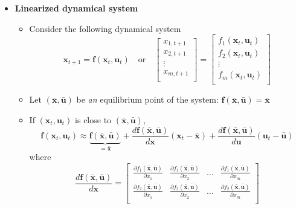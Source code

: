 \documentclass[12pt,a4paper]{article}
\begin{document}
\begin{itemize}
\item \textbf{Linearized dynamical system}
  \begin{itemize}
  \item Consider the following dynamical system
    \begin{equation}\label{eq:nlds_discrete}%
      \bm{x}_{t+1} = \bm{f}(\bm{x}_{t},\bm{u}_{t})
      \quad\text{or}\quad
      \begin{bmatrix}
        x_{1,t+1} \\
        x_{2,t+1} \\
        \vdots \\
        x_{m,t+1} \\
      \end{bmatrix}
      = 
      \begin{bmatrix}
        f_{1}(\bm{x}_{t},\bm{u}_{t}) \\
        f_{2}(\bm{x}_{t},\bm{u}_{t}) \\
        \vdots \\
        f_{m}(\bm{x}_{t},\bm{u}_{t}) \\
      \end{bmatrix}
    \end{equation}
  \item Let $(\bar{\bm{x}},\bar{\bm{u}})$ be \emph{an} equilibrium point of the system:
    $\bm{f}(\bar{\bm{x}},\bar{\bm{u}}) = \bar{\bm{x}}$
  \item If $(\bm{x}_{t},\bm{u}_{t})$ is close to $(\bar{\bm{x}},\bar{\bm{u}})$,
    \begin{equation}
      \bm{f}(\bm{x}_{t},\bm{u}_{t})
      \approx
        \underbrace{\bm{f}(\bar{\bm{x}},\bar{\bm{u}})}_{=\bar{\bm{x}}}
        +
        \frac{d\bm{f}(\bar{\bm{x}},\bar{\bm{u}})}{d\bm{x}}(\bm{x}_{t}-\bar{\bm{x}})
        +
        \frac{d\bm{f}(\bar{\bm{x}},\bar{\bm{u}})}{d\bm{u}}(\bm{u}_{t}-\bar{\bm{u}})
    \nonumber%
    \end{equation}
    where
    \begin{equation}\nonumber%
      \frac{d\bm{f}(\bar{\bm{x}},\bar{\bm{u}})}{d\bm{x}}
      =
      \begin{bmatrix}
        \frac{\partial f_{1}(\bar{\bm{x}},\bar{\bm{u}})}{\partial x_{1}} & \frac{\partial f_{1}(\bar{\bm{x}},\bar{\bm{u}})}{\partial x_{2}}  & \ldots & \frac{\partial f_{1}(\bar{\bm{x}},\bar{\bm{u}})}{\partial x_{m}} \\
        \frac{\partial f_{2}(\bar{\bm{x}},\bar{\bm{u}})}{\partial x_{1}} & \frac{\partial f_{2}(\bar{\bm{x}},\bar{\bm{u}})}{\partial x_{2}}  & \ldots & \frac{\partial f_{2}(\bar{\bm{x}},\bar{\bm{u}})}{\partial x_{m}} \\

\end{bmatrix}
\end{equation}
\end{itemize}
\end{itemize}
\end{document}
